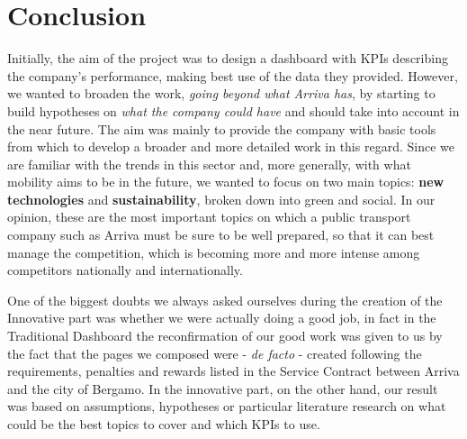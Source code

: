 \chapter{Conclusion}






Initially, the aim of the project was to design a dashboard with KPIs describing the company's performance, making best use of the data they provided. However, we wanted to broaden the work, \emph{going beyond what Arriva has}, by starting to build hypotheses on \textit{what the company could have} and should take into account in the near future. The aim was mainly to provide the company with basic tools from which to develop a broader and more detailed work in this regard. Since we are familiar with the trends in this sector and, more generally, with what mobility aims to be in the future, we wanted to focus on two main topics: \textbf{new technologies} and \textbf{sustainability}, broken down into green and social.
In our opinion, these are the most important topics on which a public transport company such as Arriva must be sure to be well prepared, so that it can best manage the competition, which is becoming more and more intense among competitors nationally and internationally.

One of the biggest doubts we always asked ourselves during the creation of the Innovative part was whether we were actually doing a good job, in fact in the Traditional Dashboard the reconfirmation of our good work was given to us by the fact that the pages we composed were - \textit{de facto} - created following the requirements, penalties and rewards listed in the Service Contract between Arriva and the city of Bergamo. In the innovative part, on the other hand, our result was based on assumptions, hypotheses or particular literature research on what could be the best topics to cover and which KPIs to use.


